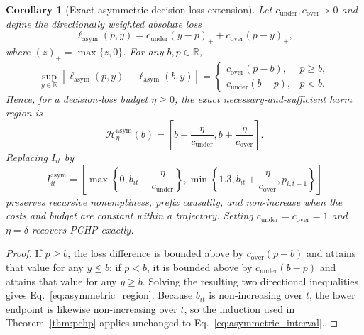 \documentclass[11pt]{article}
\newtheorem{corollary}{Corollary}
\newcommand{\R}{\mathbb{R}}
\begin{document}
\begin{corollary}[Exact asymmetric decision-loss extension]
\label{cor:asymmetric}
Let $c_{\mathrm{under}},c_{\mathrm{over}}>0$ and define the directionally weighted absolute loss
\begin{equation}
  \ell_{\mathrm{asym}}(p,y)
  =c_{\mathrm{under}}(y-p)_{+}
  +c_{\mathrm{over}}(p-y)_{+},
  \label{eq:asymmetric_loss}
\end{equation}
where $(z)_{+}=\max\{z,0\}$. For any $b,p\in\R$,
\begin{equation}
  \sup_{y\in\R}\!\left[
  \ell_{\mathrm{asym}}(p,y)-\ell_{\mathrm{asym}}(b,y)
  \right]
  =
  \begin{cases}
    c_{\mathrm{over}}(p-b), & p\geq b,\\
    c_{\mathrm{under}}(b-p), & p<b.
  \end{cases}
  \label{eq:asymmetric_identity}
\end{equation}
Hence, for a decision-loss budget $\eta\geq0$, the exact necessary-and-sufficient harm region is
\begin{equation}
  \mathcal H^{\mathrm{asym}}_{\eta}(b)
  =\left[b-\frac{\eta}{c_{\mathrm{under}}},
          b+\frac{\eta}{c_{\mathrm{over}}}\right].
  \label{eq:asymmetric_region}
\end{equation}
Replacing $I_{it}$ by
\begin{equation}
  I^{\mathrm{asym}}_{it}
  =\left[
  \max\!\left\{0,b_{it}-\frac{\eta}{c_{\mathrm{under}}}\right\},
  \min\!\left\{1.3,b_{it}+\frac{\eta}{c_{\mathrm{over}}},p_{i,t-1}\right\}
  \right]
  \label{eq:asymmetric_interval}
\end{equation}
preserves recursive nonemptiness, prefix causality, and non-increase when the costs and budget are constant within a trajectory. Setting $c_{\mathrm{under}}=c_{\mathrm{over}}=1$ and $\eta=\delta$ recovers PCHP exactly.
\end{corollary}
\begin{proof}
If $p\geq b$, the loss difference is bounded above by $c_{\mathrm{over}}(p-b)$ and attains that value for any $y\leq b$; if $p<b$, it is bounded above by $c_{\mathrm{under}}(b-p)$ and attains that value for any $y\geq b$. Solving the resulting two directional inequalities gives Eq.~\eqref{eq:asymmetric_region}. Because $b_{it}$ is non-increasing over $t$, the lower endpoint is likewise non-increasing over $t$, so the induction used in Theorem~\ref{thm:pchp} applies unchanged to Eq.~\eqref{eq:asymmetric_interval}.
\end{proof}
\end{document}
